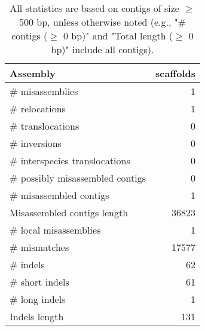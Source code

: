 \documentclass[12pt,a4paper]{article}
\begin{document}
\begin{table}[ht]
\begin{center}
\caption{All statistics are based on contigs of size $\geq$ 500 bp, unless otherwise noted (e.g., "\# contigs ($\geq$ 0 bp)" and "Total length ($\geq$ 0 bp)" include all contigs).}
\begin{tabular}{|l*{1}{|r}|}
\hline
Assembly & scaffolds \\ \hline
\# misassemblies & 1 \\ \hline
\hspace{5mm}\# relocations & 1 \\ \hline
\hspace{5mm}\# translocations & 0 \\ \hline
\hspace{5mm}\# inversions & 0 \\ \hline
\hspace{5mm}\# interspecies translocations & 0 \\ \hline
\# possibly misassembled contigs & 0 \\ \hline
\# misassembled contigs & 1 \\ \hline
Misassembled contigs length & 36823 \\ \hline
\# local misassemblies & 1 \\ \hline
\# mismatches & 17577 \\ \hline
\# indels & 62 \\ \hline
\hspace{5mm}\# short indels & 61 \\ \hline
\hspace{5mm}\# long indels & 1 \\ \hline
Indels length & 131 \\ \hline
\end{tabular}
\end{center}
\end{table}
\end{document}
